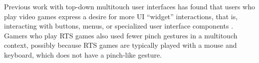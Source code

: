
Previous work with top-down multitouch user interfaces has found that users who play video games express a desire for more UI ``widget'' interactions, that is, interacting with buttons, menus, or specialized user interface components \cite{Micire:2009:ANG:1731903.1731912}. Gamers who play RTS games also used fewer pinch gestures in a multitouch context, possibly because RTS games are typically played with a mouse and keyboard, which does not have a pinch-like gesture. 

%
%
%


